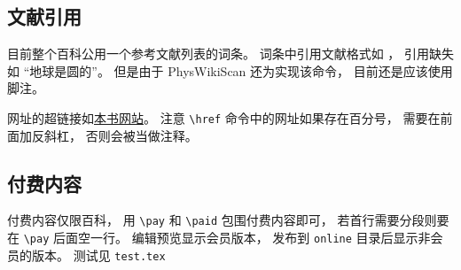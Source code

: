 
\subsection{文献引用}
目前整个百科公用一个参考文献列表的词条。 词条中引用文献格式如 \cite{PhysWiki}， 引用缺失如 “地球是圆的\needCite”。 但是由于 PhysWikiScan 还为实现该命令， 目前还是应该使用脚注。

网址的超链接如\href{https://wuli.wiki}{本书网站}。 注意 \verb|\href| 命令中的网址如果存在百分号， 需要在前面加反斜杠， 否则会被当做注释。

\subsection{付费内容}
付费内容仅限百科， 用 \verb|\pay| 和 \verb|\paid| 包围付费内容即可， 若首行需要分段则要在 \verb|\pay| 后面空一行。 编辑预览显示会员版本， 发布到 \verb|online| 目录后显示非会员的版本。 测试见 \verb|test.tex|

